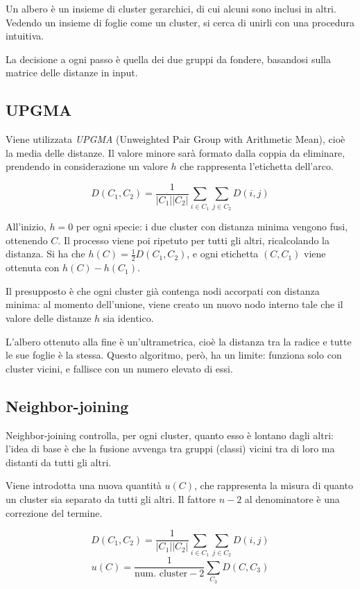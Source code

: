 Un albero è un insieme di cluster gerarchici, di cui alcuni sono inclusi in altri. Vedendo un insieme di foglie come un cluster, si cerca di unirli con una procedura intuitiva.

La decisione a ogni passo è quella dei due gruppi da fondere, basandosi sulla matrice delle distanze in input. 

\subsection{UPGMA}
Viene utilizzata \textit{UPGMA} (Unweighted Pair Group with Arithmetic Mean), cioè la media delle distanze. Il valore minore sarà formato dalla coppia da eliminare, prendendo in considerazione un valore $h$ che rappresenta l'etichetta dell'arco.

$$D(C_1, C_2) = \frac{1}{|C_1||C_2|}\sum_{i \in C_1} \sum_{j \in C_2} D(i, j)$$

All'inizio, $h = 0$ per ogni specie: i due cluster con distanza minima vengono fusi, ottenendo $C$. Il processo viene poi ripetuto per tutti gli altri, ricalcolando la distanza. Si ha che $h(C) = \frac{1}{2} D(C_1, C_2)$, e ogni etichetta $(C, C_1)$ viene ottenuta con $h(C) - h(C_1)$.

Il presupposto è che ogni cluster già contenga nodi accorpati con distanza minima: al momento dell'unione, viene creato un nuovo nodo interno tale che il valore delle distanze $h$ sia identico. 

L'albero ottenuto alla fine è un'ultrametrica, cioè la distanza tra la radice e tutte le sue foglie è la stessa. Questo algoritmo, però, ha un limite: funziona solo con cluster vicini, e fallisce con un numero elevato di essi.

\subsection{Neighbor-joining}
Neighbor-joining controlla, per ogni cluster, quanto esso è lontano dagli altri: l'idea di base è che la fusione avvenga tra gruppi (classi) vicini tra di loro ma distanti da tutti gli altri.

Viene introdotta una nuova quantità $u(C)$, che rappresenta la misura di quanto un cluster sia separato da tutti gli altri. Il fattore $n-2$ al denominatore è una correzione del termine.

$$D(C_1, C_2) = \frac{1}{|C_1||C_2|}\sum_{i \in C_1} \sum_{j \in C_2} D(i, j)$$
$$u(C) = \frac{1}{\text{num. cluster}-2} \sum_{C_3} D(C, C_3)$$

